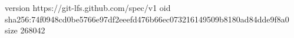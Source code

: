 version https://git-lfs.github.com/spec/v1
oid sha256:74f0948cd0be5766e97df2eeefd476b66ec073216149509b8180ad84dde9f8a0
size 268042

